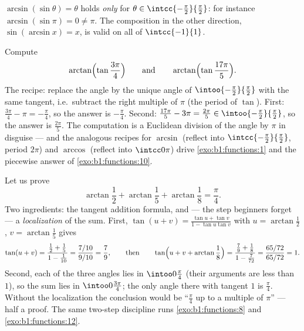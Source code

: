 \begin{remark}
$\arcsin(\sin\theta) = \theta$ holds \emph{only} for $\theta \in
\intcc{-\frac\pi2}{\frac\pi2}$: for instance
$\arcsin(\sin\pi) = 0 \neq \pi$. The composition in the other
direction, $\sin(\arcsin x) = x$, is valid on all of
$\intcc{-1}{1}$.
\end{remark}

\begin{example}
\label{ex:b1:functions:wrap}
Compute
\[
\arctan\Bigl(\tan\frac{3\pi}4\Bigr)
\qquad\text{and}\qquad
\arctan\Bigl(\tan\frac{17\pi}5\Bigr).
\]
The recipe: replace the
angle by the unique angle of $\intoo{-\frac\pi2}{\frac\pi2}$ with
the same tangent, i.e.\ subtract the right multiple of $\pi$
(the period of $\tan$). First: $\frac{3\pi}4 - \pi =
-\frac\pi4$, so the answer is $-\frac\pi4$. Second: $\frac{17\pi}
5 - 3\pi = \frac{2\pi}5 \in \intoo{-\frac\pi2}{\frac\pi2}$, so
the answer is $\frac{2\pi}5$. The computation is a Euclidean
division of the angle by $\pi$ in disguise --- and the analogous
recipes for $\arcsin$ (reflect into
$\intcc{-\frac\pi2}{\frac\pi2}$, period $2\pi$) and $\arccos$
(reflect into $\intcc0\pi$) drive \cref{exo:b1:functions:1} and
the piecewise answer of \cref{exo:b1:functions:10}.
\end{example}

\begin{example}\label{ex:b1:functions:arctansum}
Let us prove
\[
\arctan\frac12 + \arctan\frac15 + \arctan\frac18 = \frac\pi4 .
\]
Two ingredients: the tangent addition formula, and --- the step
beginners forget --- a \emph{localization} of the sum. First,
$\tan(u + v) = \frac{\tan u + \tan v}{1 - \tan u\tan v}$ with
$u = \arctan\frac12$, $v = \arctan\frac15$ gives
\[
\tan(u + v) = \frac{\frac12 + \frac15}{1 - \frac1{10}}
= \frac{7/10}{9/10} = \frac79,
\qquad\text{then}\qquad
\tan\Bigl(u + v + \arctan\frac18\Bigr)
= \frac{\frac79 + \frac18}{1 - \frac7{72}}
= \frac{65/72}{65/72} = 1 .
\]
Second, each of the three angles lies in $\intoo0{\frac\pi4}$
(their arguments are less than $1$), so the sum lies in
$\intoo0{\frac{3\pi}4}$; the only angle there with tangent $1$ is
$\frac\pi4$. Without the localization the conclusion would be
``$\frac\pi4$ up to a multiple of $\pi$'' --- half a proof. The
same two-step discipline runs \cref{exo:b1:functions:8} and
\cref{exo:b1:functions:12}.
\end{example}

